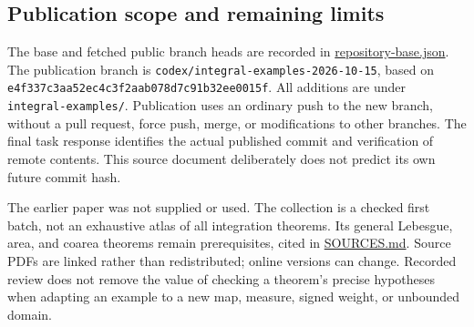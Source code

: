 \documentclass[
  11pt,
]{article}
\begin{document}
\subsection{Publication scope and remaining
limits}\label{publication-scope-and-remaining-limits}

The base and fetched public branch heads are recorded in
\href{https://github.com/Drsunflowerherbert/Codex-for-Math/tree/codex/integral-examples-2026-10-15/integral-examples/checks/repository-base.json}{repository-base.json}.
The publication branch is \texttt{codex/\allowbreak{}integral-\allowbreak{}examples-\allowbreak{}2026-\allowbreak{}10-\allowbreak{}15},
based on \texttt{e4f337c3\allowbreak{}aa52ec4c\allowbreak{}3f2aab07\allowbreak{}8d7c91b3\allowbreak{}2ee0015f}. All
additions are under \texttt{integral-\allowbreak{}examples/\allowbreak{}}. Publication uses an
ordinary push to the new branch, without a pull request, force push,
merge, or modifications to other branches. The final task response
identifies the actual published commit and verification of remote
contents. This source document deliberately does not predict its own
future commit hash.

The earlier paper was not supplied or used. The collection is a checked
first batch, not an exhaustive atlas of all integration theorems. Its
general Lebesgue, area, and coarea theorems remain prerequisites, cited
in \hyperref[bibliography]{SOURCES.md}. Source PDFs are linked rather
than redistributed; online versions can change. Recorded review does not
remove the value of checking a theorem's precise hypotheses when
adapting an example to a new map, measure, signed weight, or unbounded
domain.
\end{document}
